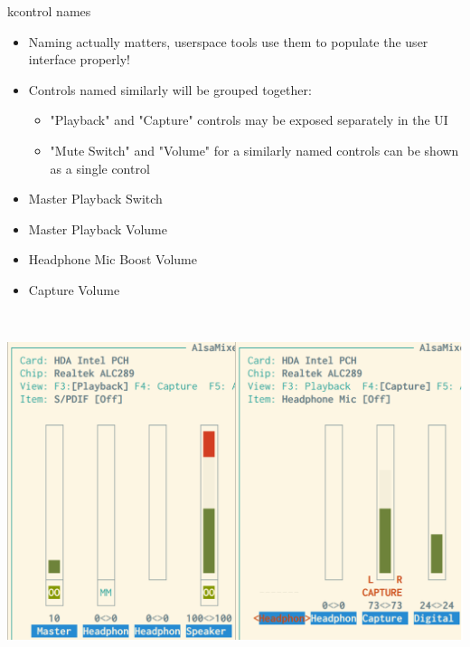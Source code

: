 \begin{frame}{kcontrol names}
  \begin{itemize}
  \item Naming actually matters, userspace tools use them to populate
    the user interface properly!
  \item Controls named similarly will be grouped together:
    \begin{itemize}
    \item "Playback" and "Capture" controls may be exposed separately
      in the UI
    \item "Mute Switch" and "Volume" for a similarly named controls
      can be shown as a single control
    \end{itemize}
  \end{itemize}
  \vspace{1em}
  \begin{minipage}[b]{0.35\textwidth}
    \begin{itemize}
    \item Master Playback Switch
    \item Master Playback Volume
    \item Headphone Mic Boost Volume
    \item Capture Volume
    \end{itemize}
    \vfill~
  \end{minipage}
  \hfill
  \begin{minipage}[b]{0.62\textwidth}
    \centering
    \includegraphics[width=.6\textwidth]{slides/audio-asoc-component-controls/alsamixer.png}
  \end{minipage}
  \begin{center}
  \end{center}
\end{frame}



